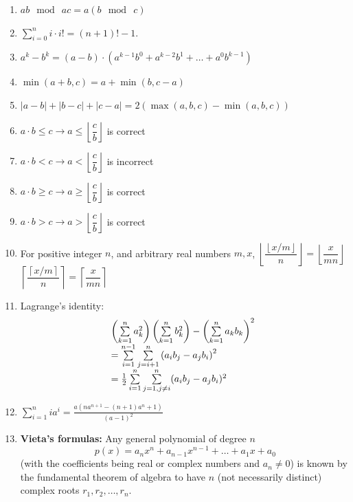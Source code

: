 \begin{enumerate}[resume]
    \item $\displaystyle ab \mod\ ac=a(b \mod\ c)$
    \item $\displaystyle \sum_{i = 0}^n{i\cdot i!=(n + 1)! - 1}$.
    \item $\displaystyle a^k - b^k = (a - b) \cdot (a^{k - 1}b^0 + a^{k - 2}b^1 + \dots + a^0b^{k - 1})$
    \item $\displaystyle \min(a + b, c) = a + \min(b, c - a)$
    \item $|a - b| + |b - c| + |c - a| = 2 (\max (a, b, c) - \min (a, b, c))$
    \item $\displaystyle a \cdot b \leq c \rightarrow a \leq \left \lfloor \dfrac{c}{b} \right \rfloor$ is correct
    \item $\displaystyle a \cdot b < c \rightarrow a <  \left \lfloor \dfrac{c}{b} \right \rfloor$ is incorrect
    \item $\displaystyle a \cdot b \geq c \rightarrow a \geq  \left \lfloor \dfrac{c}{b} \right \rfloor$ is correct
    \item $\displaystyle a \cdot b > c \rightarrow a >  \left \lfloor \dfrac{c}{b} \right \rfloor$ is correct
    \item For positive integer $n$, and arbitrary real numbers $m,x$,
    $\displaystyle \left \lfloor \dfrac{\left \lfloor x/m \right \rfloor}{n} \right \rfloor = \left \lfloor \dfrac{x}{mn} \right \rfloor$
    $\displaystyle \left \lceil \dfrac{\left \lceil x/m \right \rceil}{n} \right \rceil = \left \lceil \dfrac{x}{mn} \right \rceil$
    \item Lagrange’s identity:
    \[\displaystyle \displaystyle {\displaystyle {\begin{array}{@{}l}\left(\sum \limits_{k=1}^{n}a_{k}^{2}\right)\left(\sum \limits_{k=1}^{n}b_{k}^{2}\right)-\left(\sum\limits_{k=1}^{n}a_{k}b_{k}\right)^{2} \\ =\sum \limits_{i=1}^{n-1}\sum \limits_{j=i+1}^{n}\left(a_{i}b_{j}-a_{j}b_{i}\right)^{2} \\ ={\frac {1}{2}}\sum \limits_{i=1}^{n}\sum \limits_{j=1,j\neq i}^{n}(a_{i}b_{j}-a_{j}b_{i})^{2}\end{array}}}\]
    \item $\displaystyle \sum_{i = 1}^n{ia^i} = \frac{a(n a^{n + 1} - (n + 1) a^n + 1)}{(a - 1)^2}$
    \item \textbf{Vieta’s formulas:}
    Any general polynomial of degree $n$
    \[\displaystyle p(x) = a_nx^n + a_{n - 1}x^{n - 1} + \dots + a_1x + a_0\]
    (with the coefficients being real or complex numbers and $\displaystyle a_n \neq 0$) is known by the fundamental theorem of algebra to have $n$ (not necessarily distinct) complex roots $r_1, r_2,\dots, r_n$.

\end{enumerate}
